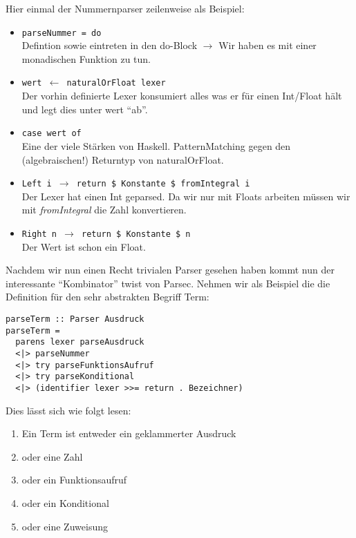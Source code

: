 \documentclass[12pt,german]{article}
\begin{document}
\noindent Hier einmal der  Nummernparser zeilenweise als Beispiel:
\begin{itemize}
\item \texttt{parseNummer = do}\\
Defintion sowie eintreten in den do-Block $\rightarrow$ Wir haben es mit einer
monadischen Funktion zu tun.
\item \texttt{wert $\leftarrow$ naturalOrFloat lexer}\\
Der vorhin definierte Lexer konsumiert alles was er für einen
Int/Float hält und legt dies unter wert ``ab''.
\item \texttt{case wert of}\\
Eine der viele Stärken von Haskell. PatternMatching gegen den
(algebraischen!) Returntyp von naturalOrFloat.
\item \texttt{Left i $\rightarrow$ return \$ Konstante \$ fromIntegral i}\\
Der Lexer hat einen Int geparsed. Da wir nur mit Floats arbeiten
müssen wir mit \textit{fromIntegral} die Zahl konvertieren.
\item \texttt{Right n $\rightarrow$ return \$ Konstante \$ n}\\
Der Wert ist schon ein Float.
\end{itemize}

Nachdem wir nun einen Recht trivialen Parser gesehen haben kommt nun
der interessante ``Kombinator'' twist von Parsec.
Nehmen wir als Beispiel die die Definition für den sehr abstrakten
Begriff Term:
\begin{lstlisting}
parseTerm :: Parser Ausdruck
parseTerm =
  parens lexer parseAusdruck
  <|> parseNummer
  <|> try parseFunktionsAufruf
  <|> try parseKonditional
  <|> (identifier lexer >>= return . Bezeichner)
\end{lstlisting}

Dies lässt sich wie folgt lesen:
\begin{enumerate}
\item Ein Term ist entweder ein geklammerter Ausdruck
\item oder eine Zahl
\item oder ein Funktionsaufruf
\item oder ein Konditional
\item oder eine Zuweisung
\end{enumerate}
\end{document}
